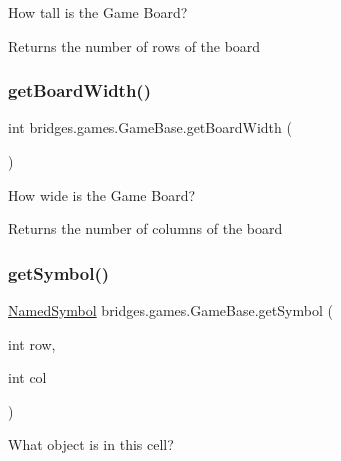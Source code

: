 How tall is the Game Board? 

\begin{DoxyReturn}{Returns}
the number of rows of the board 
\end{DoxyReturn}
\mbox{\label{classbridges_1_1games_1_1_game_base_a33018840a6f19eb54ef27e55231871f5}} 
\subsubsection{\texorpdfstring{get\+Board\+Width()}{getBoardWidth()}}
{\footnotesize\ttfamily int bridges.\+games.\+Game\+Base.\+get\+Board\+Width (\begin{DoxyParamCaption}{ }\end{DoxyParamCaption})\hspace{0.3cm}{\ttfamily [protected]}}



How wide is the Game Board? 

\begin{DoxyReturn}{Returns}
the number of columns of the board 
\end{DoxyReturn}
\mbox{\label{classbridges_1_1games_1_1_game_base_ade3cd7d7c3b317645a41ea93449c0f63}} 
\subsubsection{\texorpdfstring{get\+Symbol()}{getSymbol()}}
{\footnotesize\ttfamily \mbox{\hyperlink{enumbridges_1_1base_1_1_named_symbol}{Named\+Symbol}} bridges.\+games.\+Game\+Base.\+get\+Symbol (\begin{DoxyParamCaption}\item[{int}]{row,  }\item[{int}]{col }\end{DoxyParamCaption})\hspace{0.3cm}{\ttfamily [protected]}}



What object is in this cell? 


